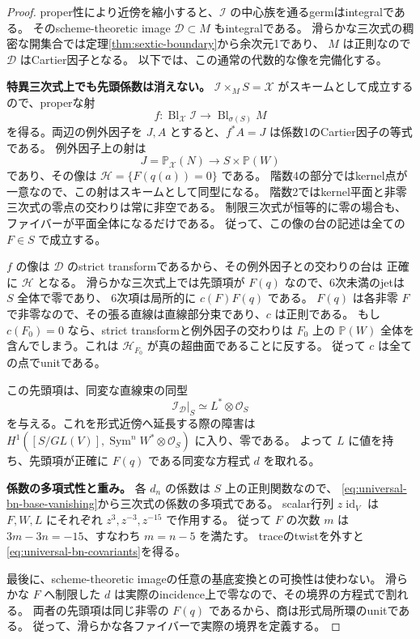 \documentclass[a4paper,11pt]{ltjsarticle}
\theoremstyle{definition}
\newcommand{\OO}{\mathcal O}
\newcommand{\PP}{\mathbb P}
\newcommand{\Sym}{\operatorname{Sym}}
\newcommand{\id}{\operatorname{id}}
\begin{document}
\begin{proof}
proper性により近傍を縮小すると、$\mathcal I$ の中心族を通るgermはintegralである。
そのscheme-theoretic image $\mathcal D\subset M$ もintegralである。
滑らかな三次式の稠密な開集合では定理\ref{thm:sextic-boundary}から余次元1であり、
$M$ は正則なので $\mathcal D$ はCartier因子となる。
以下では、この通常の代数的な像を完備化する。

\textbf{特異三次式上でも先頭係数は消えない。}
$\mathcal I\times_MS=\mathcal X$ がスキームとして成立するので、properな射
\[
 f:\operatorname{Bl}_{\mathcal X}\mathcal I
           \longrightarrow\operatorname{Bl}_{\sigma(S)}M
\]
を得る。両辺の例外因子を $J,A$ とすると、$f^*A=J$ は係数1のCartier因子の等式である。
例外因子上の射は
\[
 J=\PP_{\mathcal X}(N)\longrightarrow S\times\PP(W)
\]
であり、その像は $\mathcal H=\{F(q(a))=0\}$ である。
階数4の部分ではkernel点が一意なので、この射はスキームとして同型になる。
階数2ではkernel平面と非零三次式の零点の交わりは常に非空である。
制限三次式が恒等的に零の場合も、ファイバーが平面全体になるだけである。
従って、この像の台の記述は全ての $F\in S$ で成立する。

$f$ の像は $\mathcal D$ のstrict transformであるから、その例外因子との交わりの台は
正確に $\mathcal H$ となる。
滑らかな三次式上では先頭項が $F(q)$ なので、6次未満のjetは $S$ 全体で零であり、
6次項は局所的に $c(F)F(q)$ である。
$F(q)$ は各非零 $F$ で非零なので、その張る直線は直線部分束であり、$c$ は正則である。
もし $c(F_0)=0$ なら、strict transformと例外因子の交わりは $F_0$ 上の
$\PP(W)$ 全体を含んでしまう。これは $\mathcal H_{F_0}$ が真の超曲面であることに反する。
従って $c$ は全ての点でunitである。

この先頭項は、同変な直線束の同型
\[
                    \mathcal I_{\mathcal D}|_S\simeq L^*\otimes\OO_S
\]
を与える。これを形式近傍へ延長する際の障害は
$H^1([S/GL(V)],\Sym^nW^*\otimes\OO_S)$ に入り、零である。
よって $L$ に値を持ち、先頭項が正確に $F(q)$ である同変な方程式 $d$ を取れる。

\textbf{係数の多項式性と重み。}
各 $d_n$ の係数は $S$ 上の正則関数なので、
\eqref{eq:universal-bn-base-vanishing}から三次式の係数の多項式である。
scalar行列 $z\id_V$ は $F,W,L$ にそれぞれ $z^3,z^{-3},z^{-15}$ で作用する。
従って $F$ の次数 $m$ は $3m-3n=-15$、すなわち $m=n-5$ を満たす。
traceのtwistを外すと\eqref{eq:universal-bn-covariants}を得る。

最後に、scheme-theoretic imageの任意の基底変換との可換性は使わない。
滑らかな $F$ へ制限した $d$ は実際のincidence上で零なので、その境界の方程式で割れる。
両者の先頭項は同じ非零の $F(q)$ であるから、商は形式局所環のunitである。
従って、滑らかな各ファイバーで実際の境界を定義する。
\end{proof}
\end{document}
